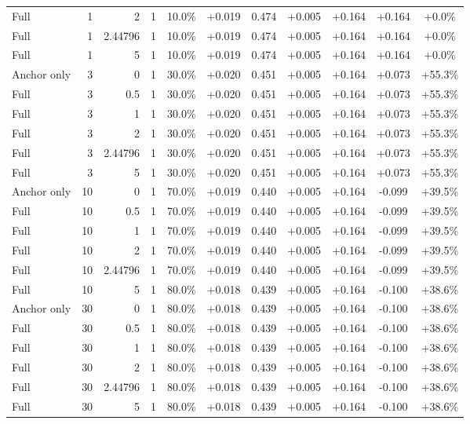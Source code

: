\begin{table}[htbp]
\begin{tabular}{lrrrccccccc}
Full & 1 & 2 & 1 & 10.0\% & +0.019 & 0.474 & +0.005 & +0.164 & +0.164 & +0.0\% \\
Full & 1 & 2.44796 & 1 & 10.0\% & +0.019 & 0.474 & +0.005 & +0.164 & +0.164 & +0.0\% \\
Full & 1 & 5 & 1 & 10.0\% & +0.019 & 0.474 & +0.005 & +0.164 & +0.164 & +0.0\% \\
Anchor only & 3 & 0 & 1 & 30.0\% & +0.020 & 0.451 & +0.005 & +0.164 & +0.073 & +55.3\% \\
Full & 3 & 0.5 & 1 & 30.0\% & +0.020 & 0.451 & +0.005 & +0.164 & +0.073 & +55.3\% \\
Full & 3 & 1 & 1 & 30.0\% & +0.020 & 0.451 & +0.005 & +0.164 & +0.073 & +55.3\% \\
Full & 3 & 2 & 1 & 30.0\% & +0.020 & 0.451 & +0.005 & +0.164 & +0.073 & +55.3\% \\
Full & 3 & 2.44796 & 1 & 30.0\% & +0.020 & 0.451 & +0.005 & +0.164 & +0.073 & +55.3\% \\
Full & 3 & 5 & 1 & 30.0\% & +0.020 & 0.451 & +0.005 & +0.164 & +0.073 & +55.3\% \\
Anchor only & 10 & 0 & 1 & 70.0\% & +0.019 & 0.440 & +0.005 & +0.164 & -0.099 & +39.5\% \\
Full & 10 & 0.5 & 1 & 70.0\% & +0.019 & 0.440 & +0.005 & +0.164 & -0.099 & +39.5\% \\
Full & 10 & 1 & 1 & 70.0\% & +0.019 & 0.440 & +0.005 & +0.164 & -0.099 & +39.5\% \\
Full & 10 & 2 & 1 & 70.0\% & +0.019 & 0.440 & +0.005 & +0.164 & -0.099 & +39.5\% \\
Full & 10 & 2.44796 & 1 & 70.0\% & +0.019 & 0.440 & +0.005 & +0.164 & -0.099 & +39.5\% \\
Full & 10 & 5 & 1 & 80.0\% & +0.018 & 0.439 & +0.005 & +0.164 & -0.100 & +38.6\% \\
Anchor only & 30 & 0 & 1 & 80.0\% & +0.018 & 0.439 & +0.005 & +0.164 & -0.100 & +38.6\% \\
Full & 30 & 0.5 & 1 & 80.0\% & +0.018 & 0.439 & +0.005 & +0.164 & -0.100 & +38.6\% \\
Full & 30 & 1 & 1 & 80.0\% & +0.018 & 0.439 & +0.005 & +0.164 & -0.100 & +38.6\% \\
Full & 30 & 2 & 1 & 80.0\% & +0.018 & 0.439 & +0.005 & +0.164 & -0.100 & +38.6\% \\
Full & 30 & 2.44796 & 1 & 80.0\% & +0.018 & 0.439 & +0.005 & +0.164 & -0.100 & +38.6\% \\
Full & 30 & 5 & 1 & 80.0\% & +0.018 & 0.439 & +0.005 & +0.164 & -0.100 & +38.6\% \\

\end{tabular}
\end{table}
